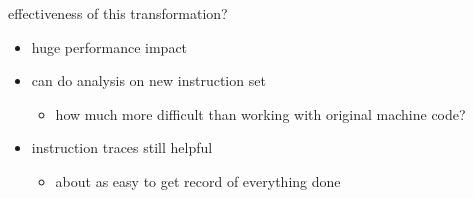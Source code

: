 \begin{frame}{effectiveness of this transformation?}
    \begin{itemize}
    \item huge performance impact
    \item can do analysis on new instruction set
        \begin{itemize}
        \item how much more difficult than working with original machine code?
        \end{itemize}
    \item instruction traces still helpful
        \begin{itemize}
        \item about as easy to get record of everything done
        \end{itemize}
    \end{itemize}
\end{frame}
